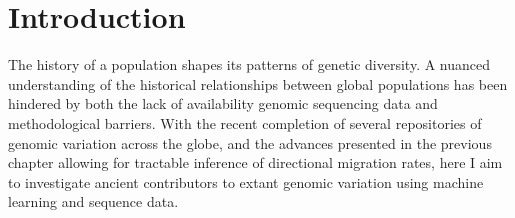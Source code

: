 \minitoc



\section{Introduction}

The history of a population shapes its patterns of genetic diversity. A nuanced understanding of the historical relationships between global populations has been hindered by both the lack of availability genomic sequencing data and methodological barriers. With the recent completion of several repositories of genomic variation across the globe, and the advances presented in the previous chapter allowing for tractable inference of directional migration rates, here I aim to investigate ancient contributors to extant genomic variation using machine learning and sequence data. 

